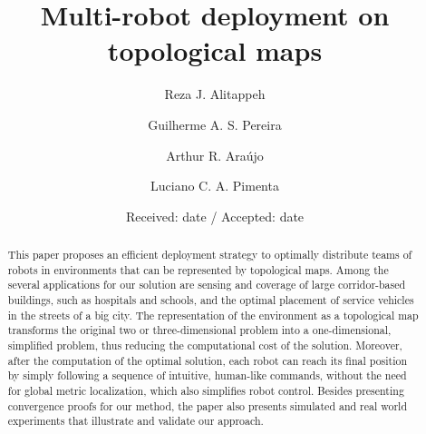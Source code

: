 \documentclass[twocolumn]{svjour3}       %
\begin{document}
\title{Multi-robot deployment on topological maps}



\author{Reza J. Alitappeh \and Guilherme A. S. Pereira \and Arthur R. Ara\'ujo \and Luciano C. A. Pimenta  }



\date{Received: date / Accepted: date}


\maketitle

\begin{abstract}

This paper proposes an efficient deployment strategy to optimally distribute teams of robots in environments that can be represented by topological maps. Among the several applications for our solution are sensing and coverage of large corridor-based buildings, such as hospitals and schools, and the optimal placement of service vehicles in the streets of a big city. The representation of the environment as a topological map transforms the original two or three-dimensional problem into a one-dimensional, simplified problem, thus reducing the computational cost of the solution. Moreover, after the computation of the optimal solution, each robot can reach its final position by simply following a sequence of intuitive, human-like commands, without the need for global metric localization, which also simplifies robot control. %
Besides presenting convergence proofs for our method, the paper also presents simulated and real world experiments that illustrate and validate our approach.

\end{abstract}
\end{document}
